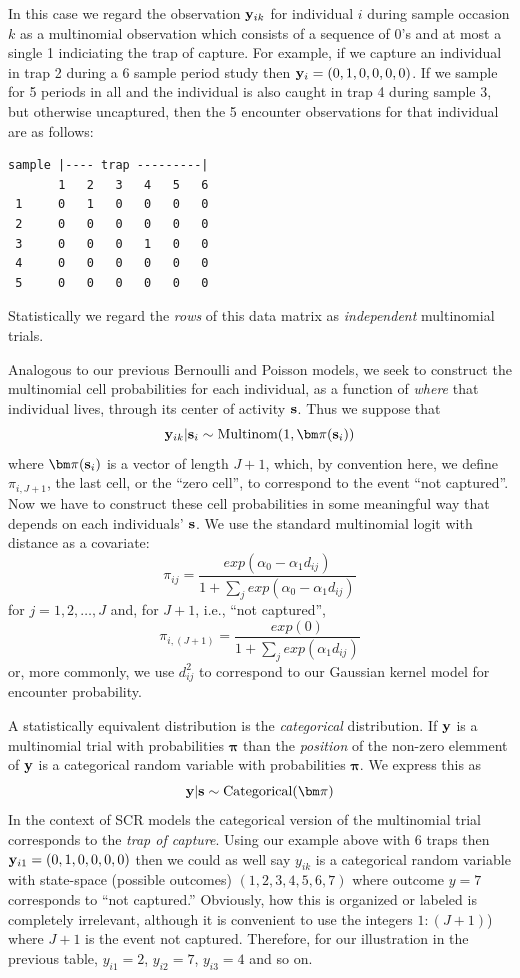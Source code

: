 In this case we regard the observation ${\bf y}_{ik}$ for
individual $i$ during sample occasion $k$ as a multinomial observation
which consists of a sequence of 0's and at most a single 1 indiciating
the trap of capture. For example, if we capture an individual in trap
2 during a 6 sample period study then ${\bf y}_{i} = (0,1,0,0,0,0)$.
If we sample for 5 periods in all and the individual is also caught
in trap 4 during sample 3, but otherwise uncaptured, then the 5 encounter observations for that
individual are as follows:
\begin{verbatim}
sample |---- trap ---------|
       1   2   3   4   5   6
 1     0   1   0   0   0   0
 2     0   0   0   0   0   0
 3     0   0   0   1   0   0
 4     0   0   0   0   0   0
 5     0   0   0   0   0   0
\end{verbatim}
Statistically we regard the {\it rows} of this data matrix as {\it
  independent} multinomial trials.

Analogous to our previous Bernoulli and Poisson models, we seek to
construct the multinomial cell probabilities for each individual, as a
function of {\it where} that individual lives, through its center of
activity ${\bf s}$. Thus we suppose that
\begin{equation}
 {\bf y}_{ik}|{\bf s}_{i} \sim \mbox{Multinom}(1, {\bm \pi}({\bf s}_{i}) )
\label{poisson-mn.eq.mn}
\end{equation}
where ${\bm \pi}({\bf s}_{i})$ is a vector of length $J+1$, which, by
convention here, we define $\pi_{i,J+1}$, the last cell, or the ``zero
cell'', to correspond to the event ``not captured''.
Now we have to
construct these cell probabilities in some meaningful way that depends
on each individuals' ${\bf s}$.
We use the standard
multinomial logit with distance as a covariate:
\[
 \pi_{ij} = \frac{  exp(\alpha_{0} - \alpha_{1} d_{ij}) }{ 1+ \sum_{j}
   exp(\alpha_{0} - \alpha_{1} d_{ij})}
\]
for $j=1,2,\ldots,J$ and, for $J+1$, i.e., ``not captured'',
\[
 \pi_{i,(J+1)} = \frac{  exp(0) }
                    { 1+ \sum_{j} exp(\alpha_{1} d_{ij})}
\]
or, more commonly, we use $d_{ij}^{2}$ to correspond to our Gaussian
kernel model for encounter probability.

A statistically equivalent distribution is the {\it categorical}
distribution.  If ${\bf y}$ is a multinomial trial with probabilities
${\bm \pi}$ than the {\it position} of the non-zero elemment of ${\bf
  y}$ is a categorical random variable with probabilities ${\bm \pi}$.
We express this as
\[
{\bf y}|{\bf s} \sim \mbox{Categorical}( {\bm \pi} )
\]
In the context of SCR models the categorical version of the
multinomial trial corresponds to the {\it trap of capture}.  Using our
example above with 6 traps then ${\bf y}_{i1} = (0,1,0,0,0,0)$ then we
could as well say $y_{ik}$ is a categorical random variable with
state-space (possible outcomes) $(1,2,3,4,5,6,7)$ where outcome $y=7$
corresponds to ``not captured.'' Obviously, how this is organized or
labeled is completely irrelevant, although it is convenient to use the
integers $1:(J+1)$) where $J+1$ is the event not captured.  Therefore,
for our illustration in the previous table, $y_{i1} = 2$, $y_{i2} =
7$, $y_{i3} = 4$ and so on.

